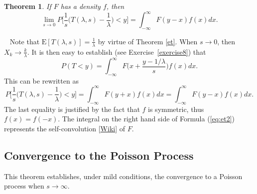 \documentclass[10pt]{article}
\newtheorem{theorem}{Theorem}[section]
\newenvironment{proof}[1][Proof]{\begin{trivlist}
\item[\hskip \labelsep {\bfseries #1}]}{\end{trivlist}}
\newcommand{\qed}{\nobreak \ifvmode \relax \else
      \ifdim\lastskip<1.5em \hskip-\lastskip
      \hskip1.5em plus0em minus0.5em \fi \nobreak
      \vrule height0.75em width0.5em depth0.25em\fi}
\begin{document}
\begin{theorem}
\label{et2}
If  $F$ has a density $f$, then 
\begin{equation}
   \lim_{s\rightarrow 0} P\Big[\frac{1}{s}\Big(T(\lambda,s)-\frac{1}{\lambda}\Big)<y\Big] = \int_{-\infty}^{\infty} F(y-x)f(x)dx.\label{eq:et2}
\end{equation}
\end{theorem}
\begin{proof}
$ $ \newline \
Note that $\mbox{E}[T(\lambda,s)]=\frac{1}{\lambda}$ by virtue of Theorem \ref{et}. When $s\rightarrow 0$, then $X_k\rightarrow \frac{k}{\lambda}$. It is then easy to establish (see Exercise~\ref{exercise8}) that  
$$P(T<y)=\int_{-\infty}^\infty F\Big(x+\frac{y-1/\lambda}{s}\Big)f(x)dx.$$
 This can be rewritten as 
$$ P\Big[\frac{1}{s}\Big(T(\lambda,s)-\frac{1}{\lambda}\Big)<y\Big] =\int_{-\infty}^{\infty} F(y+x)f(x)dx = \int_{-\infty}^{\infty} F(y-x)f(x)dx.$$
The last equality is justified by the fact that $f$ is symmetric, thus $f(x)=f(-x)$. The integral on the right hand side of Formula (\ref{eq:et2}) represents the \textcolor{index}{self-convolution}
[\href{https://en.wikipedia.org/wiki/Convolution_of_probability_distributions}{Wiki}] of $F$. \qed
\end{proof}

\subsection{Convergence to the Poisson Process}\label{convpp}

This theorem establishes, under mild conditions, the convergence to a \textcolor{index}{Poisson process} when $s\rightarrow\infty$.
\end{document}

